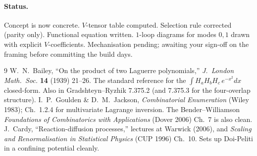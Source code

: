 \documentclass[11pt,a4paper]{article}
\begin{document}
\paragraph{Status.} Concept is now concrete. $V$-tensor table computed. Selection rule
corrected (parity only). Functional equation written. $1$-loop diagrams for modes $0,1$
drawn with explicit $V$-coefficients. Mechanisation pending; awaiting your sign-off on the
framing before committing the build days.

\begin{thebibliography}{9}
W.\ N.\ Bailey, ``On the product of two Laguerre polynomials,''
\emph{J.\ London Math.\ Soc.} \textbf{14} (1939) 21--26.
The standard reference for the $\int H_{a}H_{b}H_{c}\,e^{-x^{2}}dx$ closed-form.
Also in Gradshteyn--Ryzhik 7.375.2 (and 7.375.3 for the four-overlap structure).
I.\ P.\ Goulden \& D.\ M.\ Jackson, \emph{Combinatorial Enumeration} (Wiley 1983);
Ch.~1.2.4 for multivariate Lagrange inversion. The Bender--Williamson \emph{Foundations
of Combinatorics with Applications} (Dover 2006) Ch.~7 is also clean.
J.\ Cardy, ``Reaction-diffusion processes,'' lectures at Warwick (2006), and
\emph{Scaling and Renormalisation in Statistical Physics} (CUP 1996) Ch.~10. Sets up
Doi-Peliti in a confining potential cleanly.
\end{thebibliography}
\end{document}
